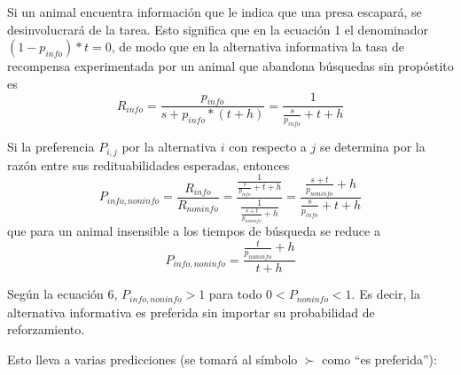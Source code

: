\documentclass[a4paper,12pt]{article}
\begin{document}
Si un animal encuentra información que le indica que una presa escapará, se desinvolucrará de la tarea. Esto significa que en la ecuación 1 el denominador $(1-p_{info})*t=0$, de modo que en la alternativa informativa la tasa de recompensa experimentada por un animal que abandona búsquedas sin propóstito es
\begin{equation}
	R_{info}=\frac{p_{info}}{s+p_{info}*(t+h)} = \frac{1}{\frac{s}{p_{info}}+t+h}
\end{equation}

Si la preferencia $P_{i,j}$ por la alternativa $i$ con respecto a $j$ se determina por la razón entre sus redituabilidades esperadas, entonces
\begin{equation}
P_{info,noninfo}=\frac{R_{info}}{R_{noninfo}} = \frac{\frac{1}{\frac{s}{p_{info}} + t + h}}{\frac{1}{\frac{s+t}{p_{noninfo}} + h}} = \frac{\frac{s+t}{p_{noninfo}}+h}{\frac{s}{p_{info}}+t+h}
\end{equation}
que para un animal insensible a los tiempos de búsqueda se reduce a
\begin{equation}
	P_{info,noninfo} = \frac{\frac{t}{p_{noninfo}} + h}{t+h}
\end{equation}

Según la ecuación 6, $P_{info,noninfo} > 1$ para todo $0 < P_{noninfo} < 1$. Es decir, la alternativa informativa es preferida sin importar su probabilidad de reforzamiento.

Esto lleva a varias predicciones (se tomará al símbolo $\succ$ como ``es preferida''):
\end{document}
